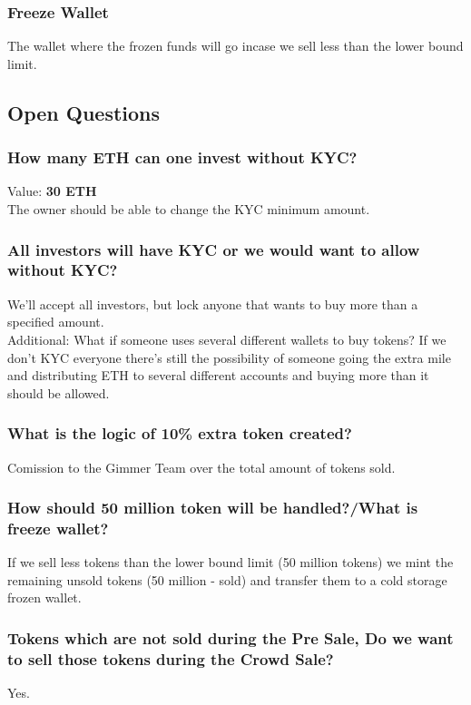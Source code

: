 \documentclass[11pt]{article} %
\begin{document}
\subsubsection{Freeze Wallet}
The wallet where the frozen funds will go incase we sell less than the lower bound limit.

\subsection {Open Questions}

\subsubsection{How many ETH can one invest without KYC?}
Value: \textbf{30 ETH}\\
The owner should be able to change the KYC minimum amount.

\subsubsection{All investors will have KYC or we would want to allow without KYC?}
We'll accept all investors, but lock anyone that wants to buy more than a specified amount.\\
Additional: What if someone uses several different wallets to buy tokens? If we don't KYC everyone there's still the possibility of someone going the extra mile and distributing ETH to several different accounts and buying more than it should be allowed.

\subsubsection{What is the logic of 10\% extra token created?}
Comission to the Gimmer Team over the total amount of tokens sold.

\subsubsection{How should 50 million token will be handled?/What is freeze wallet?}
If we sell less tokens than the lower bound limit (50 million tokens) we mint the remaining unsold tokens (50 million - sold) and transfer them to a cold storage frozen wallet.\\

\subsubsection{Tokens which are not sold during the Pre Sale, Do we want to sell those tokens during the Crowd Sale?}
Yes.
\end{document}
